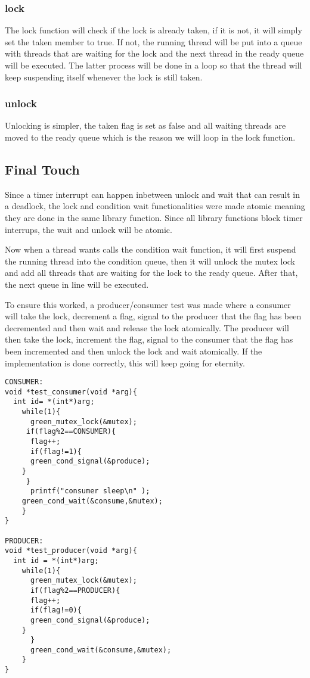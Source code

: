 \documentclass[12pt]{article}
\begin{document}
\subsubsection{lock}
The lock function will check if the lock is already taken, if it is not, it will simply set the taken member to true. If not, the running thread will be put into a queue with threads that are waiting for the lock and the next thread in the ready queue will be executed. The latter process will be done in a loop so that the thread will keep suspending itself whenever the lock is still taken.

\subsubsection{unlock}
Unlocking is simpler, the taken flag is set as false and all waiting threads are moved to the ready queue which is the reason we will loop in the lock function. 




\subsection{Final Touch}
Since a timer interrupt can happen inbetween unlock and wait that can result in a deadlock, the lock and condition wait functionalities were made atomic meaning they are done in the same library function. Since all library functions block timer interrups, the wait and unlock will be atomic.

Now when a thread wants calls the condition wait function, it will first suspend the running thread into the condition queue, then it will unlock the mutex lock and add all threads that are waiting for the lock to the ready queue. After that, the next queue in line will be executed. 

To ensure this worked, a producer/consumer test was made where a consumer will take the lock, decrement a flag, signal to the producer that the flag has been decremented and then wait and release the lock atomically. The producer will then take the lock, increment the flag, signal to the consumer that the flag has been incremented and then unlock the lock and wait atomically. If the implementation is done correctly, this will keep going for eternity.
\begin{lstlisting}
CONSUMER:
void *test_consumer(void *arg){
  int id= *(int*)arg;
    while(1){
      green_mutex_lock(&mutex);
     if(flag%2==CONSUMER){
      flag++;
      if(flag!=1){
      green_cond_signal(&produce);
    }
     }
      printf("consumer sleep\n" );
    green_cond_wait(&consume,&mutex);
    }
}

PRODUCER: 
void *test_producer(void *arg){
  int id = *(int*)arg;
    while(1){
      green_mutex_lock(&mutex);
      if(flag%2==PRODUCER){
      flag++;
      if(flag!=0){
      green_cond_signal(&produce);
    }
      }
      green_cond_wait(&consume,&mutex);
    }
}

\end{lstlisting} 
\end{document}
